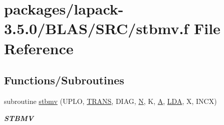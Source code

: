 \hypertarget{lapack-3_85_80_2BLAS_2SRC_2stbmv_8f}{}\section{packages/lapack-\/3.5.0/\+B\+L\+A\+S/\+S\+R\+C/stbmv.f File Reference}
\label{lapack-3_85_80_2BLAS_2SRC_2stbmv_8f}
\subsection*{Functions/\+Subroutines}
\begin{DoxyCompactItemize}
\item 
subroutine \hyperlink{group__single__blas__level2_gab1000098b0929f8256ced0ab89141b31}{stbmv} (U\+P\+L\+O, \hyperlink{superlu__enum__consts_8h_a0c4e17b2d5cea33f9991ccc6a6678d62a1f61e3015bfe0f0c2c3fda4c5a0cdf58}{T\+R\+A\+N\+S}, D\+I\+A\+G, \hyperlink{polmisc_8c_a0240ac851181b84ac374872dc5434ee4}{N}, K, \hyperlink{classA}{A}, \hyperlink{example__user_8c_ae946da542ce0db94dced19b2ecefd1aa}{L\+D\+A}, X, I\+N\+C\+X)
\begin{DoxyCompactList}\small\item\em {\bfseries S\+T\+B\+M\+V} \end{DoxyCompactList}\end{DoxyCompactItemize}
